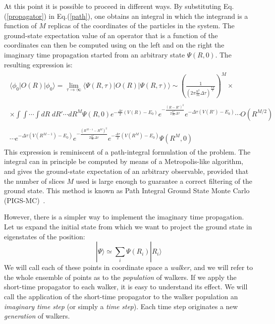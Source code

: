 At this point it is possible to proceed in different ways. By substituting Eq.(\ref{propagator}) in Eq.(\ref{path}), one obtains an integral in which the integrand is a function of $M$ replicas of the coordinates of the particles in the system. The ground-state expectation value of an operator that is a function of the coordinates can then  be computed using on the left and on the right the imaginary time propagation started from an arbitrary state $\Psi(R,0)$. The resulting expression is:
\begin{eqnarray}
\begin{array}{c}
\langle \phi_0|O(R)|\phi_0\rangle = 
\displaystyle\lim_{\tau\rightarrow\infty}\langle \Psi(R,\tau)|O(R)|\Psi(R,\tau)\rangle\sim\left(\frac{1}{(2\pi\frac{\hbar^2}{m}\Delta\tau)^\frac{3A}{2}}\right)^M\times\\ \\
\times\displaystyle \int\int\cdots\int dR\;dR'\cdots dR^M\Psi(R,0)e^{-\frac{\Delta\tau}{2}(V(R)-E_0)} e^{-\frac{(R-R')^2}{2\frac{\hbar^2}{m}\Delta\tau}}e^{-\Delta\tau(V(R')-E_0)}
\cdots O(R^{M/2}) \\ \\
\displaystyle
\cdots e^{-{\Delta\tau}(V(R^{M-1})-E_0)} e^{-\frac{(R^{M-1}-R^M)^2}{2\frac{\hbar^2}{m}\Delta\tau}}e^{-\frac{\Delta\tau}{2}(V(R^M)-E_0)}\Psi(R^M,0)
\end{array}
\end{eqnarray}	
This expression is reminiscent of a path-integral formulation of the problem. The integral can in principle be computed by means of a  Metropolis-like algorithm, and gives the ground-state
expectation of an arbitrary observable, provided that the number of slices $M$ used is  large enough to guarantee a correct filtering of the ground state. This method is known as Path Integral Ground State Monte Carlo (PIGS-MC)~\cite{Sarsa00}.

However, there is a simpler way to implement the imaginary time propagation. Let us expand the initial state from which we want to project the ground state in eigenstates of the position:
\begin{equation}
|\Psi\rangle \simeq \sum_i\Psi(R_i)|R_i\rangle
\end{equation} 
We will call each of these points in coordinate space a {\it walker}, and we will refer to the whole ensemble of points as to the {\it population} of walkers. If we apply the short-time propagator to each walker, it is easy to understand its effect. We will call the application of the short-time propagator to the walker population an {\it imaginary time step} (or simply a {\it time step}). Each time step originates a new {\it generation} of walkers.

